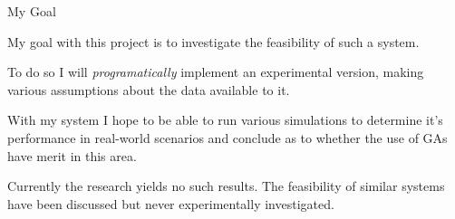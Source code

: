 \documentclass{beamer}
\begin{document}
\begin{frame}{My Goal}


    My goal with this project is to investigate the feasibility of such a system. 

    To do so I will \textit{programatically} implement an experimental version, making various assumptions about the data available to it.

    With my system I hope to be able to run various simulations to determine it's performance in real-world scenarios and conclude as to whether the use of GAs have merit in this area. 

    Currently the research yields no such results. The feasibility of similar systems have been discussed\cite{kalaOnroadIntelligentVehicles2016} but never experimentally investigated.
    
\end{frame}
\end{document}
